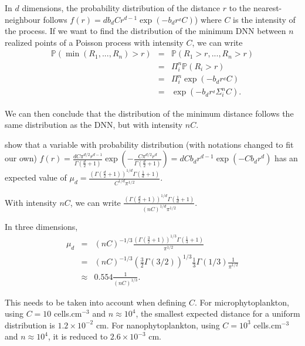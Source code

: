 \documentclass[english]{article}
\begin{document}
In $d$ dimensions, the probability distribution of the distance $r$
to the nearest-neighbour follows $f(r)=db_{d}Cr^{d-1}\exp(-b_{d}r^{_{d}}C)$)
where $C$ is the intensity of the process. If we want to find the
distribution of the minimum DNN between $n$ realized points of a
Poisson process with intensity $C$, we can write
\begin{equation}
\begin{array}{ccc}
\mathbb{P}(\min(R_{1},...,R_{n})>r) & = & \mathbb{P}(R_{1}>r,...,R_{n}>r)\\
 & = & \Pi_{i}^{n}\mathbb{P}(R_{i}>r)\\
 & = & \Pi_{i}^{n}\exp(-b_{d}r^{_{d}}C)\\
 & = & \exp(-b_{d}r^{_{d}}\Sigma_{i}^{n}C).
\end{array}
\end{equation}

We can then conclude that the distribution of the minimum distance
follows the same distribution as the DNN, but with intensity $nC$.

\medskip{}

\citet{clark_generalization_1979} show that a variable with probability
distribution (with notations changed to fit our own) $f(r)=\frac{dC\pi^{d/2}r^{d-1}}{\Gamma(\frac{d}{2}+1)}\exp(-\frac{C\pi^{d/2}r^{d}}{\Gamma(\frac{d}{2}+1)})=dCb_{d}r^{d-1}\exp(-Cb_{d}r^{d})$
has an expected value of $\mu_{d}=\frac{\left(\Gamma(\frac{d}{2}+1)\right)^{1/d}\Gamma(\frac{1}{d}+1)}{C^{1/d}\pi^{1/2}}$.

With intensity $nC$, we can write $\frac{\left(\Gamma(\frac{d}{2}+1)\right)^{1/d}\Gamma(\frac{1}{d}+1)}{(nC)^{1/d}\pi^{1/2}}$.

\medskip{}

In three dimensions, 
\begin{equation}
\begin{array}{ccc}
\mu_{d} & = & (nC)^{-1/3}\frac{\left(\Gamma(\frac{3}{2}+1)\right)^{1/3}\Gamma(\frac{1}{3}+1)}{\pi^{1/2}}\\
 & = & (nC)^{-1/3}\left(\frac{3}{2}\Gamma(3/2)\right)^{1/3}\frac{1}{3}\Gamma(1/3)\frac{1}{\pi^{1/2}}\\
 & \approx & 0.554\frac{1}{(nC)^{1/3}}.
\end{array}\label{eq:dnn_realization}
\end{equation}

This needs to be taken into account when defining $C$. For microphytoplankton,
using $C=10$ cells.cm$^{-3}$ and $n\approx10^{4}$, the smallest
expected distance for a uniform distribution is $1.2\times10^{-2}$
cm. For nanophytoplankton, using $C=10^{3}$ cells.cm$^{-3}$ and
$n\approx10^{4}$, it is reduced to $2.6\times10^{-3}$ cm. \medskip{}
\end{document}
